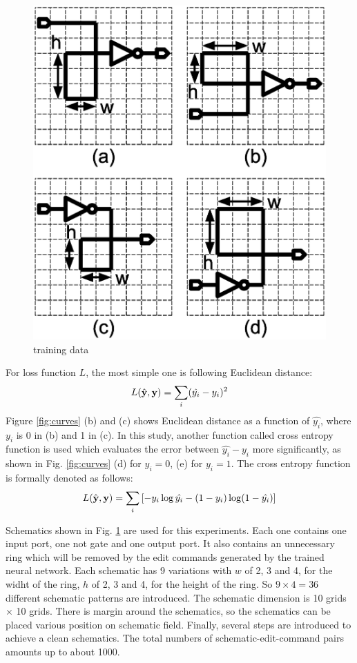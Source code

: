 \documentclass[twocolumn]{article}
\begin{document}
\begin{figure}[!tp]
  \begin{minipage}{\hsize}
 \begin{center}
   \includegraphics[width=0.7\hsize]{fig/training_data_02.eps}
   \caption{training data}
   \label{fig:training_data}
 \end{center}
  \end{minipage}
\end{figure}




For loss function $L$, the most simple one is following Euclidean distance:
\begin{eqnarray}
L(\hat{\bf y}, {\bf y}) = \sum_{i}(\hat{y_i} - y_i)^2
\end{eqnarray}
Figure \ref{fig:curves} (b) and (c) shows Euclidean distance
as a function of $\hat{y_i}$, where $y_i$ is 0 in (b) and 1 in (c).
In this study, another function called cross entropy function is used
which evaluates the error between $\hat{y_i}-y_i$ more significantly,
as shown in Fig. \ref{fig:curves} (d) for $y_i = 0$, (e) for $y_i = 1$.
The cross entropy function is formally denoted as follows:
\begin{eqnarray}
L(\hat{\bf y}, {\bf y}) =
\sum_i \left[ - y_i \log \hat{y_i} - (1-y_i) \log (1-\hat{y_i}) \right]
\end{eqnarray}

Schematics shown in Fig. \ref{fig:training_data} are used for this experiments.
Each one contains one input port, one not gate and one output port.
It also contains an unnecessary ring which will be removed
by the edit commands generated by the trained neural network.
Each schematic has 9 variations with
$w$ of 2, 3 and 4, for the widht of the ring,
$h$ of 2, 3 and 4, for the height of the ring.
So $9 \times 4 = 36$ different schematic patterns are introduced.
The schematic dimension is 10 grids $\times$ 10 grids.
There is margin around the schematics,
so the schematics can be placed various position on schematic field.
Finally, several steps are introduced to achieve a clean schematics.
The total numbers of schematic-edit-command pairs amounts up to about 1000.
\end{document}
